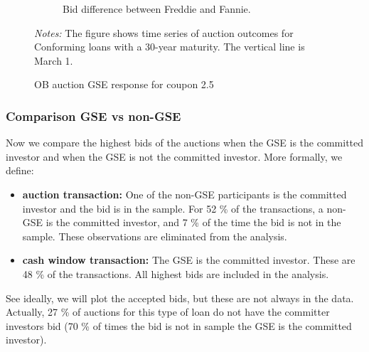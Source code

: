 \documentclass[11pt,a4paper]{article}
\begin{document}
\begin{figure}[h]
\begin{subfigure}[b]{0.49\textwidth}
      \caption{ Bid difference between Freddie and Fannie.}
     \end{subfigure}
     \caption{OB auction  GSE response for coupon 2.5 } 
   \begin{minipage}{\textwidth}
      \footnotesize{\textit{Notes:} The figure shows time series of auction outcomes for Conforming loans with a 30-year maturity. The vertical line is March 1.  } 
      \end{minipage}
\end{figure}

\pagebreak
\subsubsection{Comparison GSE vs non-GSE}

Now we compare the highest bids of the auctions when the GSE is the committed investor and when the GSE is not the committed investor. More formally, we define: 

\begin{itemize}
  \item \textbf{auction transaction: } One of the non-GSE participants is the committed investor and the bid is in the sample. For 52 \% of the transactions, a non-GSE is the committed investor, and 7 \% of the time the bid is not in the sample. These observations are eliminated from the analysis.
  \item \textbf{cash window transaction: } The GSE is the committed investor. These are 48 \% of the transactions. All highest bids are included in the analysis. 
\end{itemize}

See ideally, we will plot the accepted bids, but these are not always in the data. Actually, 27 \% of auctions for this type of loan do not have the committer investors bid (70 \%  of times the bid is not in sample the GSE is the committed investor). 
\end{document}
